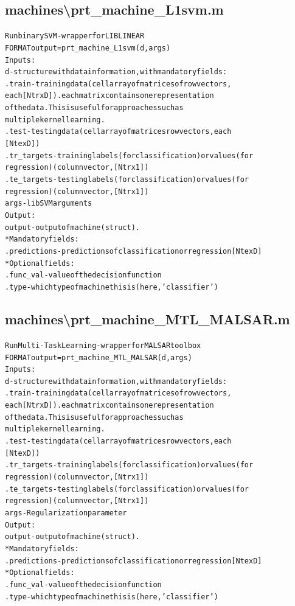\subsection{machines\textbackslash prt\_machine\_L1svm.m}
\begin{alltt}

 Run binary SVM - wrapper for LIBLINEAR
 FORMAT output = prt\_machine\_L1svm(d,args)
 Inputs:
   d         - structure with data information, with mandatory fields:
     .train      - training data (cell array of matrices of row vectors,
                   each [Ntr x D]). each matrix contains one representation
                   of the data. This is useful for approaches such as
                   multiple kernel learning.
     .test       - testing data  (cell array of matrices row vectors, each
                   [Nte x D])
     .tr\_targets - training labels (for classification) or values (for
                   regression) (column vector, [Ntr x 1])
     .te\_targets - testing labels (for classification) or values (for
                   regression) (column vector, [Ntr x 1])
    args     - libSVM arguments
 Output:
    output  - output of machine (struct).
     * Mandatory fields:
      .predictions - predictions of classification or regression [Nte x D]
     * Optional fields:
      .func\_val - value of the decision function
      .type     - which type of machine this is (here, 'classifier')
\end{alltt}


\subsection{machines\textbackslash prt\_machine\_MTL\_MALSAR.m}
\begin{alltt}

 Run Multi-Task Learning - wrapper for MALSAR toolbox
 FORMAT output = prt\_machine\_MTL\_MALSAR(d,args)
 Inputs:
   d         - structure with data information, with mandatory fields:
     .train      - training data (cell array of matrices of row vectors,
                   each [Ntr x D]). each matrix contains one representation
                   of the data. This is useful for approaches such as
                   multiple kernel learning.
     .test       - testing data  (cell array of matrices row vectors, each
                   [Nte x D])
     .tr\_targets - training labels (for classification) or values (for
                   regression) (column vector, [Ntr x 1])
     .te\_targets - testing labels (for classification) or values (for
                   regression) (column vector, [Ntr x 1])
    args         - Regularization parameter
 Output:
    output  - output of machine (struct).
     * Mandatory fields:
      .predictions - predictions of classification or regression [Nte x D]
     * Optional fields:
      .func\_val - value of the decision function
      .type     - which type of machine this is (here, 'classifier')
\end{alltt}


